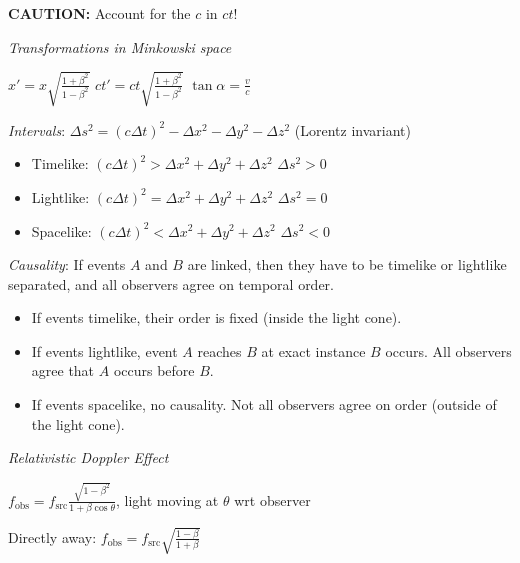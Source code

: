 \documentclass[twocolumn]{article}
\begin{document}
\textbf{CAUTION:} Account for the $c$ in $ct$!


\newpage


\textit{Transformations in Minkowski space}

$x' = x \sqrt{\frac{1+\beta^2}{1-\beta^2}}$ \hfill $ct' = ct \sqrt{\frac{1+\beta^2}{1-\beta^2}}$ \hfill $\tan \alpha = \frac{v}{c}$

\textit{Intervals}: $\Delta s^2 = (c \Delta t)^2 - \Delta x^2 - \Delta y^2 - \Delta z^2$ \hfill (Lorentz invariant)

\vspace{-.5em}
\begin{itemize}
    \item Timelike: $(c \Delta t)^2 > \Delta x^2 + \Delta y^2 + \Delta z^2$ \hfill $\Delta s^2 > 0$
    \item Lightlike: $(c \Delta t)^2 = \Delta x^2 + \Delta y^2 + \Delta z^2$ \hfill $\Delta s^2 = 0$
    \item Spacelike: $(c \Delta t)^2 < \Delta x^2 + \Delta y^2 + \Delta z^2$ \hfill $\Delta s^2 < 0$
\end{itemize} \vspace{-.5em}

\textit{Causality}: If events $A$ and $B$ are linked, then they have to be timelike or lightlike separated, and all observers agree on temporal order.

\vspace{-.5em}
\begin{itemize}
    \item If events timelike, their order is fixed (inside the light cone).
    \item If events lightlike, event $A$ reaches $B$ at exact instance $B$ occurs. All observers agree that $A$ occurs before $B$.
    \item If events spacelike, no causality. Not all observers agree on order (outside of the light cone).
\end{itemize} \vspace{-.5em}

\vspace{-.5em}
\dotfill

\textit{Relativistic Doppler Effect}

$f_{\text{obs}} = f_{\text{src}} \frac{\sqrt{1-\beta^2}}{1 + \beta \cos \theta}$, \hfill light moving at $\theta$ wrt observer

Directly away: $f_{\text{obs}} = f_{\text{src}} \sqrt{\frac{1-\beta}{1+\beta}}$
\end{document}

